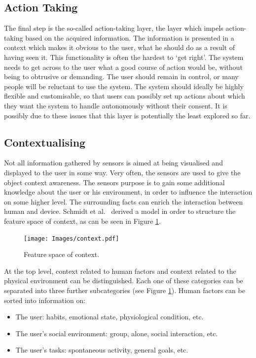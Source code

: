 \subsection{Action Taking}
\label{actionTaking}
The final step is the so-called action-taking layer, the layer which impels action-taking based on the acquired information. 
The information is presented in a context which makes it obvious to the user, what he should do as a result of having seen it.
This functionality is often the hardest to `get right'. 
The system needs to get across to the user what a good course of action would be, without being to obtrusive or demanding. 
The user should remain in control, or many people will be reluctant to use the system. The system should ideally be highly flexible and customisable, so that users can possibly set up actions about which they want the system to handle autonomously without their consent. It is possibly due to these issues that this layer is potentially the least explored so far.

\subsection{Contextualising}
Not all information gathered by sensors is aimed at being visualised and displayed to the user in some way. 
Very often, the sensors are used to give the object context awareness.
The sensors purpose is to gain some additional knowledge about the user or his environment, in order to influence the interaction on some higher level. 
The surrounding facts can enrich the interaction between human and device. 
Schmidt et al.\ \cite{schmidt99} derived a model in order to structure the feature space of context, as can be seen in Figure \ref{fig:context}.

\begin{figure}[!t]
	\centering
	\texttt{[image: Images/context.pdf]}
	\caption{Feature space of context.}
	\label{fig:context}
\end{figure}

At the top level, context related to human factors and context related to the physical environment can be distinguished. Each one of these categories can be separated into three further subcategories (see Figure \ref{fig:context}). Human factors can be sorted into information on:

\begin{itemize}
	\item The user: habits, emotional state, physiological condition, etc.
	\item The user's social environment: group, alone, social interaction, etc.
	\item The user's tasks: spontaneous activity, general goals, etc.
\end{itemize}

